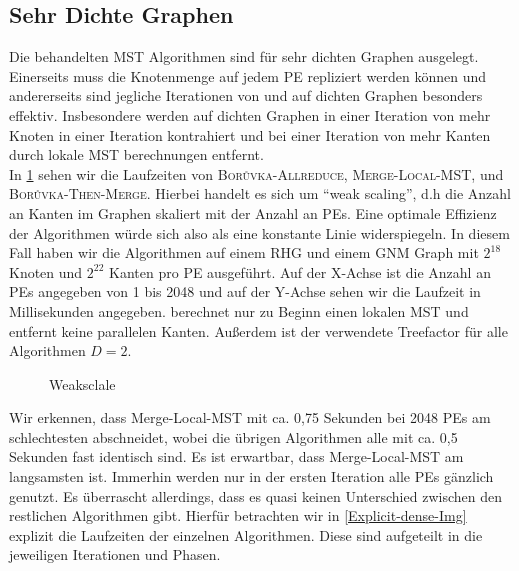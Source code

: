 \subsection{Sehr Dichte Graphen}\label{dense}
Die behandelten MST Algorithmen sind für sehr dichten Graphen ausgelegt. Einerseits muss die Knotenmenge auf jedem PE repliziert werden können und andererseits sind jegliche Iterationen von \boruvkaAllreduce und \mergeMST auf dichten Graphen besonders effektiv. Insbesondere werden auf dichten Graphen in einer Iteration von \boruvkasAlgorithmus \space  mehr Knoten in einer Iteration kontrahiert und bei einer Iteration von \mergeMST mehr Kanten durch lokale MST berechnungen entfernt.\\
In \cref{WeakSkale-dense-Img} sehen wir die Laufzeiten von \textsc{Bor{\r u}vka-Allreduce}, \textsc{Merge-Local-MST}, \boruvkaMixedMerge und \textsc{Bor{\r u}vka-Then-Merge}. Hierbei handelt es sich um \enquote{weak scaling}, d.h die Anzahl an Kanten im Graphen skaliert mit der Anzahl an PEs. Eine optimale Effizienz der Algorithmen würde sich also als eine konstante Linie widerspiegeln. In diesem Fall haben wir die Algorithmen auf einem RHG und einem GNM Graph mit $2^{18}$ Knoten und $2^{22}$ Kanten pro PE ausgeführt. Auf der X-Achse ist die Anzahl an PEs angegeben von 1 bis 2048 und auf der Y-Achse sehen wir die Laufzeit in Millisekunden angegeben. \boruvkaAllreduce berechnet nur zu Beginn einen lokalen MST und entfernt keine parallelen Kanten. Außerdem ist der verwendete Treefactor für alle Algorithmen $D=2$.

\begin{figure}[H]
    \centering
    
    
    \caption{Weaksclale}
    \label{WeakSkale-dense-Img}
\end{figure}

Wir erkennen, dass Merge-Local-MST mit ca. 0,75 Sekunden bei 2048 PEs am schlechtesten abschneidet, wobei die übrigen Algorithmen alle mit ca. 0,5 Sekunden fast identisch sind. Es ist erwartbar, dass Merge-Local-MST am langsamsten ist. Immerhin werden nur in der ersten Iteration alle PEs gänzlich genutzt. Es überrascht allerdings, dass es quasi keinen Unterschied zwischen den restlichen Algorithmen gibt. Hierfür betrachten wir in \cref{Explicit-dense-Img} explizit die Laufzeiten der einzelnen Algorithmen. Diese sind aufgeteilt in die jeweiligen Iterationen und Phasen.



